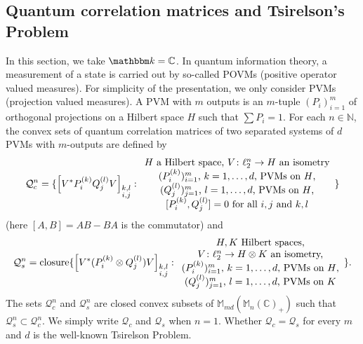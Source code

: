 \documentclass[12pt]{amsart}
\theoremstyle{definition}
\begin{document}
\subsection{Quantum correlation matrices and Tsirelson's Problem}
In this section, we take ${{\mathbbm k}}={{\mathbb C}}$.
In quantum information theory, a measurement of a state is carried out by
so-called POVMs (positive operator valued measures).
For simplicity of the presentation, we only consider PVMs (projection valued measures).
A PVM with $m$ outputs is an $m$-tuple $(P_i)_{i=1}^m$ of
orthogonal projections on a Hilbert space ${H}$ such that $\sum P_i=1$.
For each $n\in{{\mathbb N}}$, the convex sets of quantum correlation matrices
of two separated systems of $d$ PVMs with $m$-outputs are defined by
\[
{{\mathcal Q}}_c^n=\{ {\left[ {V^*P_i^{(k)} Q_j^{(l)}V} \right]}_{\begin{subarray}{c}k,l\\ i,j\end{subarray}} :
\begin{array}{c}
\mbox{${H}$ a Hilbert space, $V\colon\ell_2^n\to{H}$ an isometry}\\
\mbox{$(P_i^{(k)})_{i=1}^m$, $k=1,\ldots,d$, PVMs on ${H}$,}\\
\mbox{$(Q_j^{(l)})_{j=1}^m$, $l=1,\ldots,d$, PVMs on ${H}$,}\\
\mbox{$[P_i^{(k)},Q_j^{(l)}]=0$ for all $i,j$ and $k,l$}
\end{array}
\}
\]
(here $[A,B]=AB-BA$ is the commutator) and
\[
{{\mathcal Q}}_s^n=\mathrm{closure}\{ {\left[ {V^*(P_i^{(k)}\otimes Q_j^{(l)})V} \right]}_{\begin{subarray}{c}k,l\\ i,j\end{subarray}} :
\begin{array}{c}
\mbox{${H},{K}$ Hilbert spaces,}\\
\mbox{$V\colon\ell_2^n\to{H}\otimes{K}$ an isometry,}\\
\mbox{$(P_i^{(k)})_{i=1}^m$, $k=1,\ldots,d$, PVMs on ${H}$,}\\
\mbox{$(Q_j^{(l)})_{j=1}^m$, $l=1,\ldots,d$, PVMs on ${K}$}
\end{array}
\}.
\]
The sets ${{\mathcal Q}}_c^n$ and ${{\mathcal Q}}_s^n$ are closed convex subsets of ${{\mathbb M}}_{md}({{\mathbb M}}_n({{\mathbb C}})_+)$
such that ${{\mathcal Q}}_s^n\subset{{\mathcal Q}}_c^n$.
We simply write ${{\mathcal Q}}_c$ and ${{\mathcal Q}}_s$ when $n=1$.
Whether ${{\mathcal Q}}_c={{\mathcal Q}}_s$ for every $m$ and $d$ is the well-known Tsirelson Problem.
\end{document}
